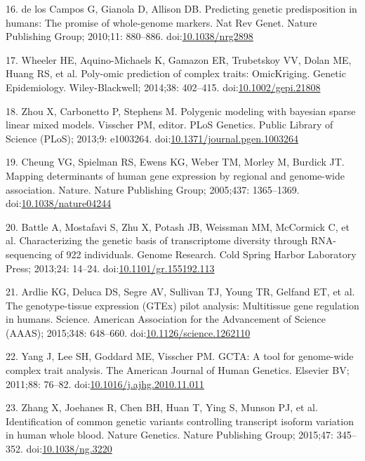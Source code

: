 \documentclass[]{article}
\begin{document}
16. {de los Campos} G, Gianola D, Allison DB. Predicting genetic
predisposition in humans: The promise of whole-genome markers. Nat Rev
Genet. Nature Publishing Group; 2010;11: 880--886.
doi:\href{http://dx.doi.org/10.1038/nrg2898}{10.1038/nrg2898}

17. Wheeler HE, Aquino-Michaels K, Gamazon ER, Trubetskoy VV, Dolan ME,
Huang RS, et al. Poly-omic prediction of complex traits: OmicKriging.
Genetic Epidemiology. Wiley-Blackwell; 2014;38: 402--415.
doi:\href{http://dx.doi.org/10.1002/gepi.21808}{10.1002/gepi.21808}

18. Zhou X, Carbonetto P, Stephens M. Polygenic modeling with bayesian
sparse linear mixed models. Visscher PM, editor. PLoS Genetics. Public
Library of Science (PLoS); 2013;9: e1003264.
doi:\href{http://dx.doi.org/10.1371/journal.pgen.1003264}{10.1371/journal.pgen.1003264}

19. Cheung VG, Spielman RS, Ewens KG, Weber TM, Morley M, Burdick JT.
Mapping determinants of human gene expression by regional and
genome-wide association. Nature. Nature Publishing Group; 2005;437:
1365--1369.
doi:\href{http://dx.doi.org/10.1038/nature04244}{10.1038/nature04244}

20. Battle A, Mostafavi S, Zhu X, Potash JB, Weissman MM, McCormick C,
et al. Characterizing the genetic basis of transcriptome diversity
through RNA-sequencing of 922 individuals. Genome Research. Cold Spring
Harbor Laboratory Press; 2013;24: 14--24.
doi:\href{http://dx.doi.org/10.1101/gr.155192.113}{10.1101/gr.155192.113}

21. Ardlie KG, Deluca DS, Segre AV, Sullivan TJ, Young TR, Gelfand ET,
et al. The genotype-tissue expression (GTEx) pilot analysis: Multitissue
gene regulation in humans. Science. American Association for the
Advancement of Science (AAAS); 2015;348: 648--660.
doi:\href{http://dx.doi.org/10.1126/science.1262110}{10.1126/science.1262110}

22. Yang J, Lee SH, Goddard ME, Visscher PM. GCTA: A tool for
genome-wide complex trait analysis. The American Journal of Human
Genetics. Elsevier BV; 2011;88: 76--82.
doi:\href{http://dx.doi.org/10.1016/j.ajhg.2010.11.011}{10.1016/j.ajhg.2010.11.011}

23. Zhang X, Joehanes R, Chen BH, Huan T, Ying S, Munson PJ, et al.
Identification of common genetic variants controlling transcript isoform
variation in human whole blood. Nature Genetics. Nature Publishing
Group; 2015;47: 345--352.
doi:\href{http://dx.doi.org/10.1038/ng.3220}{10.1038/ng.3220}
\end{document}
